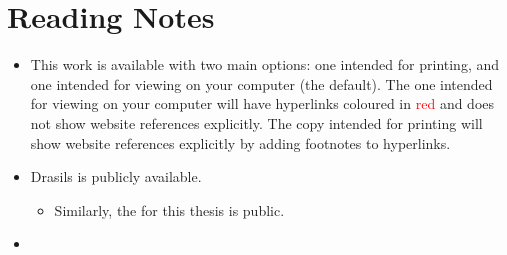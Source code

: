 \chapter{Reading Notes}
\label{chap:reading_notes}

\begin{itemize}

    \item This work is available with two main options: one intended for
          printing, and one intended for viewing on your computer (the default).
          The one intended for viewing on your computer will have hyperlinks
          coloured in \textcolor{red}{red} and does not show website references
          explicitly. The copy intended for printing will show website
          references explicitly by adding footnotes to hyperlinks.

    \item Drasils  is publicly
          available.

          \begin{itemize}

              \item Similarly, the 
                    for this thesis is public. 

          \end{itemize}

    \item {}

\end{itemize}
